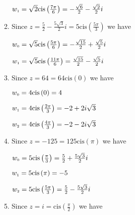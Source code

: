 \begin{enumerate}
\begin{multicols}{2}
$w_{\text{\tiny$1$}} = \sqrt{2}\text{cis}\left(\frac{7\pi}{6}\right) = -\frac{\sqrt{6}}{2}-\frac{\sqrt{2}}{2} i$

\end{multicols}

\item Since $z=\frac{5}{2} - \frac{5\sqrt{3}}{2}i = 5\text{cis}\left(\frac{5\pi}{3}\right)$ we have 

\begin{multicols}{2}

$w_{\text{\tiny$0$}} =\sqrt{5}\text{cis}\left(\frac{5\pi}{6}\right) = -\frac{\sqrt{15}}{2} + \frac{\sqrt{5}}{2}i$

$w_{\text{\tiny$1$}} = \sqrt{5}\text{cis}\left(\frac{11\pi}{6}\right) = \frac{\sqrt{15}}{2} - \frac{\sqrt{5}}{2}i$

\end{multicols}

\item Since $z = 64 = 64\text{cis}\left(0\right)$ we have 

\begin{multicols}{3}

$w_{\text{\tiny$0$}} = 4\text{cis}\left(0\right) = 4$

$w_{\text{\tiny$1$}} =4\text{cis}\left(\frac{2\pi}{3}\right) = -2 + 2i\sqrt{3}$

$w_{\text{\tiny$2$}} = 4\text{cis}\left(\frac{4\pi}{3}\right) =  -2 - 2i\sqrt{3}$

\end{multicols}

\pagebreak

\item Since $z = -125 = 125\text{cis}\left(\pi\right)$ we have 

\begin{multicols}{3}

$w_{\text{\tiny$0$}} = 5\text{cis}\left(\frac{\pi}{3}\right) = \frac{5}{2} + \frac{5\sqrt{3}}{2} i$

$w_{\text{\tiny$1$}} =5\text{cis}\left(\pi\right) = -5$

$w_{\text{\tiny$2$}} = 5\text{cis}\left(\frac{5\pi}{3}\right) = \frac{5}{2} - \frac{5\sqrt{3}}{2} i$

\end{multicols}

\item Since $z = i = \text{cis}\left(\frac{\pi}{2}\right)$ we have 

\begin{multicols}{3}


\end{multicols}
\end{enumerate}
